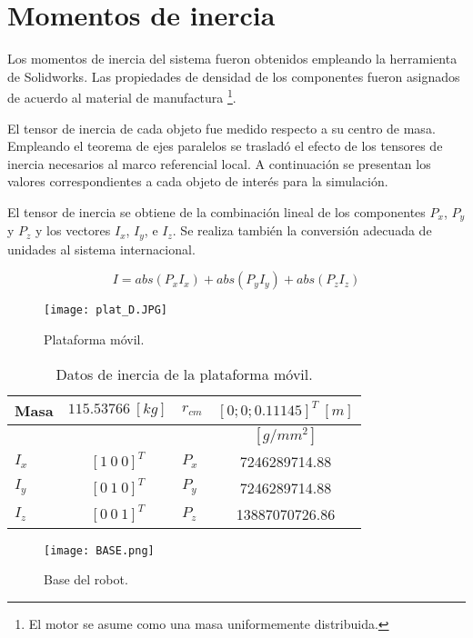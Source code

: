 \section{Momentos de inercia}
\label{sec: inertia}

Los momentos de inercia del sistema fueron obtenidos
empleando la herramienta de Solidworks. 
Las propiedades de densidad de los componentes 
fueron asignados de acuerdo al material de manufactura
\footnote{El motor se asume como una masa uniformemente distribuida.}.

El tensor de inercia de cada objeto fue medido respecto a su centro de masa.
Empleando el teorema de ejes paralelos 
\cite{olguin20183d}
se trasladó el efecto de los tensores de inercia necesarios al marco referencial local.
A continuación se presentan los valores correspondientes a cada objeto de interés para la simulación.

El tensor de inercia se obtiene de la combinación lineal 
de los componentes $P_x$, $P_y$ y $P_z$ y los vectores $ I_x$, $ I_y$, e $ I_z$.
Se realiza también la conversión adecuada de unidades al
sistema internacional.

\begin{equation*}
 I = abs(P_x  I_x) + abs(P_y I_y) +abs(P_z I_z)
\end{equation*}

\begin{figure}[htb!]
    \centering
    \texttt{[image: plat\_D.JPG]}
    \caption{Plataforma móvil.}
    \label{fig: cad platform}
\end{figure}

\begin{table}[hb!]
 \begin{center}
\begin{tabular}{lclc}
 Masa & $  115.53766 \ [kg]$ & $r_{cm}$ &  $[0; 0; 0.11145]^T \ [m]$ \\
 \hline
 & & & $[g/mm^2]$\\
 \hline
 $ I_x $ & $ [1 \ 0 \ 0]^T $ & $ P_x $ & 7246289714.88\\
 $ I_y $ & $ [0 \ 1 \ 0]^T $ & $ P_y $ & 7246289714.88\\
 $ I_z $ & $ [0 \ 0 \ 1]^T $ & $ P_z $ & 13887070726.86
\end{tabular}
\end{center}
\caption{Datos de inercia de la plataforma móvil.}
\label{tab: inertia table platform}
\end{table}


\begin{figure}[htb!]
    \centering
    \texttt{[image: BASE.png]}
    \caption{Base del robot.}
    \label{fig: cad base}
\end{figure}
% 

